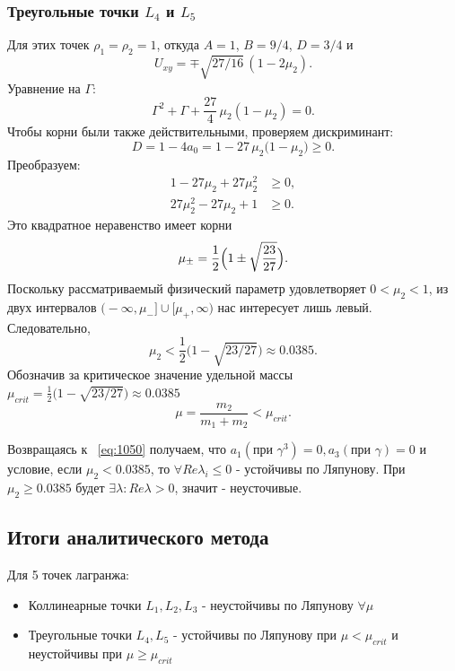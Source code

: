 \documentclass[12pt]{article}
\newcommand{\mutwo}{\mu_2}
\begin{document}
\subsubsection{Треугольные точки $L_4$ и $L_5$}
Для этих точек $\rho_1=\rho_2=1$, откуда $A=1$, $B=9/4$, $D=3/4$ и
\[U_{xy}=\mp\sqrt{27/16}\,(1-2\mutwo).\]
Уравнение на $\Gamma$:
\begin{equation}\tag{1116}
  \Gamma^{2}+\Gamma+\frac{27}{4}\,\mutwo(1-\mutwo)=0.
\end{equation}
Чтобы корни были также действительными, проверяем дискриминант:
\begin{equation}
D=1-4a_0=1-27\,\mu_2\bigl(1-\mu_2\bigr)\ge0.
\end{equation}
Преобразуем:
\begin{align}
1-27\mu_2+27\mu_2^2&\ge0,\\[2pt]
27\mu_2^2-27\mu_2+1&\ge0.
\end{align}
Это квадратное неравенство имеет корни
\[\mu_{\pm}=\frac12\Bigl(1\pm\sqrt{\frac{23}{27}}\Bigr).
\]
Поскольку рассматриваемый физический параметр удовлетворяет \(0<\mu_2<1\),
из двух интервалов
\(\bigl(-\infty,\mu_-\bigr]\cup\bigl[\mu_+,\infty\bigr)\)
нас интересует лишь левый.  Следовательно,
\begin{equation}\tag{1117}
  \mutwo<\frac12\bigl(1-\sqrt{23/27}\bigr)\approx0.0385.
\end{equation}
Обозначив за критическое значение удельной массы $\mu_{crit} = \frac12\bigl(1-\sqrt{23/27}\bigr)\approx0.0385$
\begin{equation}\tag{1118}
  \mu = \frac{m_2}{m_1+m_2}< \mu_{crit}.
\end{equation}

Возвращаясь к ~\eqref{eq:1050} получаем, что $a_1(\text{при }\gamma^3) = 0, a_3(\text{при }\gamma) = 0$ и условие, если $\mutwo < 0.0385$, то $\forall Re\lambda_i \leqslant 0$ - устойчивы по Ляпунову. При $\mutwo \geqslant 0.0385$ будет $\exists\lambda: Re\lambda > 0$, значит - неусточивые.

\bigskip

\subsection{Итоги аналитического метода}

Для 5 точек лагранжа: 
\begin{itemize}
    \item Коллинеарные точки $L_1,L_2,L_3$ - неустойчивы по Ляпунову $\forall \mu$
    \item Треугольные точки $L_4, L_5$ - устойчивы по Ляпунову при $\mu<\mu_{crit}$ и неустойчивы при $\mu \geqslant \mu_{crit}$
\end{itemize}
\end{document}
